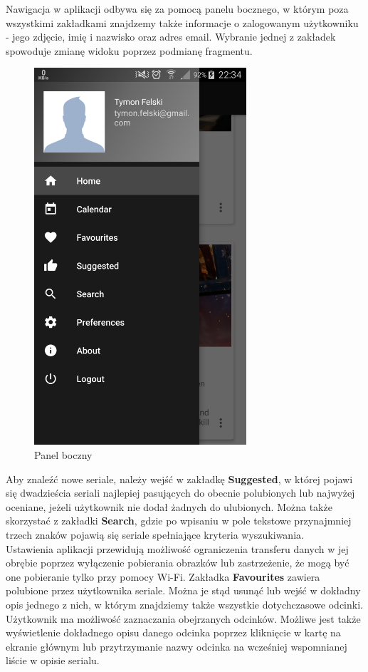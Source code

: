 \documentclass[10pt,a4paper]{article}
\begin{document}
\newpage
\noindent
Nawigacja w aplikacji odbywa się za pomocą panelu bocznego, w którym poza wszystkimi zakładkami znajdzemy także informacje o zalogowanym użytkowniku - jego zdjęcie, imię i nazwisko oraz adres email. Wybranie jednej z zakładek spowoduje zmianę widoku poprzez podmianę fragmentu.
\begin{figure}[H]
\centering
\includegraphics[height=14cm]{Resources/Images/drawer.png}
\caption{Panel boczny}
\end{figure}
\noindent
Aby znaleźć nowe seriale, należy wejść w zakładkę \textbf{Suggested}, w której pojawi się dwadzieścia seriali najlepiej pasujących do obecnie polubionych lub najwyżej oceniane, jeżeli użytkownik nie dodał żadnych do ulubionych. Można także skorzystać z zakładki \textbf{Search}, gdzie po wpisaniu w pole tekstowe przynajmniej trzech znaków pojawią się seriale spełniające kryteria wyszukiwania.\\[\baselineskip]
Ustawienia aplikacji przewidują możliwość ograniczenia transferu danych w jej obrębie poprzez wyłączenie pobierania obrazków lub zastrzeżenie, że mogą być one pobieranie tylko przy pomocy Wi-Fi.
\newpage
\noindent
Zakładka \textbf{Favourites} zawiera polubione przez użytkownika seriale. Można je stąd usunąć lub wejść w dokładny opis jednego z nich, w którym znajdziemy także wszystkie dotychczasowe odcinki. Użytkownik ma możliwość zaznaczania obejrzanych odcinków. Możliwe jest także wyświetlenie dokładnego opisu danego odcinka poprzez kliknięcie w kartę na ekranie głównym lub przytrzymanie nazwy odcinka na wcześniej wspomnianej liście w opisie serialu.
\end{document}
